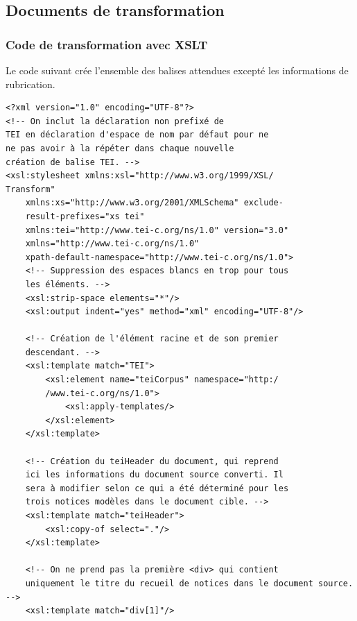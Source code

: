 \documentclass[a4paper,12pt,twoside]{book}
\begin{document}
	\subsection{Documents de transformation}
	
	\subsubsection{\label{code_XSLT}Code de transformation avec XSLT}
	
	Le code suivant crée l'ensemble des balises attendues excepté les informations de rubrication. 
	
	\begin{verbatim}
<?xml version="1.0" encoding="UTF-8"?>
<!-- On inclut la déclaration non prefixé de 
TEI en déclaration d'espace de nom par défaut pour ne 
ne pas avoir à la répéter dans chaque nouvelle
création de balise TEI. -->
<xsl:stylesheet xmlns:xsl="http://www.w3.org/1999/XSL/
Transform"
    xmlns:xs="http://www.w3.org/2001/XMLSchema" exclude-
    result-prefixes="xs tei" 
    xmlns:tei="http://www.tei-c.org/ns/1.0" version="3.0"
    xmlns="http://www.tei-c.org/ns/1.0"
    xpath-default-namespace="http://www.tei-c.org/ns/1.0">
    <!-- Suppression des espaces blancs en trop pour tous 
    les éléments. -->
    <xsl:strip-space elements="*"/>
    <xsl:output indent="yes" method="xml" encoding="UTF-8"/>
    
    <!-- Création de l'élément racine et de son premier 
    descendant. -->
    <xsl:template match="TEI">
        <xsl:element name="teiCorpus" namespace="http:/
        /www.tei-c.org/ns/1.0">
            <xsl:apply-templates/>
        </xsl:element>
    </xsl:template>
    
    <!-- Création du teiHeader du document, qui reprend 
    ici les informations du document source converti. Il 
    sera à modifier selon ce qui a été déterminé pour les 
    trois notices modèles dans le document cible. -->
    <xsl:template match="teiHeader">
        <xsl:copy-of select="."/>
    </xsl:template>
    
    <!-- On ne prend pas la première <div> qui contient 
    uniquement le titre du recueil de notices dans le document source.  -->
    <xsl:template match="div[1]"/>
    

\end{verbatim}
\end{document}
